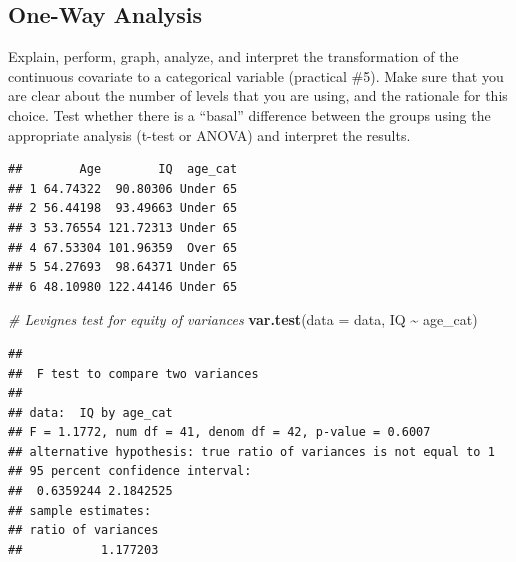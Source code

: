 \documentclass[
]{book}
\newenvironment{Shaded}{\begin{snugshade}}{\end{snugshade}}
\newcommand{\AttributeTok}[1]{\textcolor[rgb]{0.13,0.29,0.53}{#1}}
\newcommand{\CommentTok}[1]{\textcolor[rgb]{0.56,0.35,0.01}{\textit{#1}}}
\newcommand{\ConstantTok}[1]{\textcolor[rgb]{0.56,0.35,0.01}{#1}}
\newcommand{\DecValTok}[1]{\textcolor[rgb]{0.00,0.00,0.81}{#1}}
\newcommand{\FunctionTok}[1]{\textcolor[rgb]{0.13,0.29,0.53}{\textbf{#1}}}
\newcommand{\NormalTok}[1]{#1}
\newcommand{\OtherTok}[1]{\textcolor[rgb]{0.56,0.35,0.01}{#1}}
\newcommand{\SpecialCharTok}[1]{\textcolor[rgb]{0.81,0.36,0.00}{\textbf{#1}}}
\newcommand{\StringTok}[1]{\textcolor[rgb]{0.31,0.60,0.02}{#1}}
\begin{document}
\subsection*{One-Way Analysis}\label{one-way-analysis}

Explain, perform, graph, analyze, and interpret the transformation of the continuous covariate to a categorical variable (practical \#5). Make sure that you are clear about the number of levels that you are using, and the rationale for this choice. Test whether there is a ``basal'' difference between the groups using the appropriate analysis (t-test or ANOVA) and interpret the results.

\begin{Shaded}
\end{Shaded}

\begin{verbatim}
##        Age        IQ  age_cat
## 1 64.74322  90.80306 Under 65
## 2 56.44198  93.49663 Under 65
## 3 53.76554 121.72313 Under 65
## 4 67.53304 101.96359  Over 65
## 5 54.27693  98.64371 Under 65
## 6 48.10980 122.44146 Under 65
\end{verbatim}

\begin{Shaded}
\begin{Highlighting}[]
\CommentTok{\# Levigne\textquotesingle{}s test for equity of variances}
\FunctionTok{var.test}\NormalTok{(}\AttributeTok{data =}\NormalTok{ data, IQ }\SpecialCharTok{\textasciitilde{}}\NormalTok{ age\_cat)}
\end{Highlighting}
\end{Shaded}

\begin{verbatim}
## 
##  F test to compare two variances
## 
## data:  IQ by age_cat
## F = 1.1772, num df = 41, denom df = 42, p-value = 0.6007
## alternative hypothesis: true ratio of variances is not equal to 1
## 95 percent confidence interval:
##  0.6359244 2.1842525
## sample estimates:
## ratio of variances 
##           1.177203
\end{verbatim}
\end{document}
